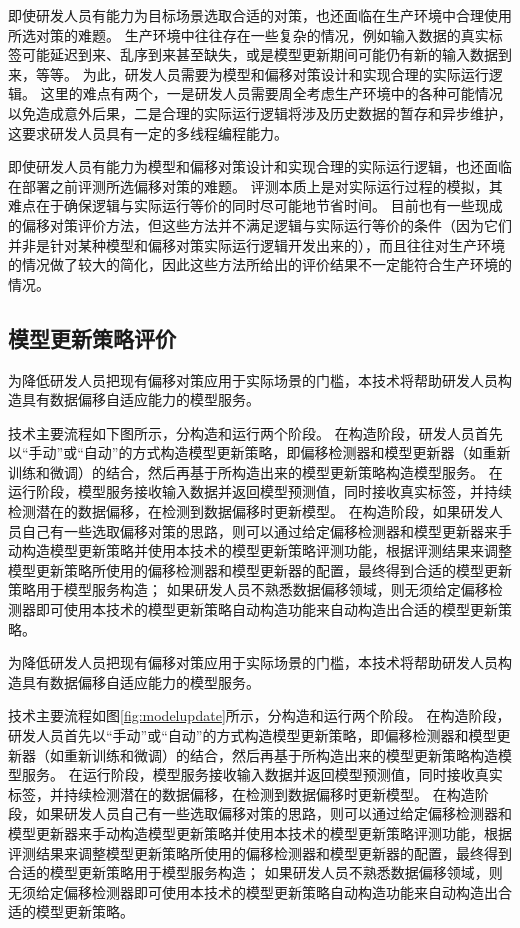 即使研发人员有能力为目标场景选取合适的对策，也还面临在生产环境中合理使用所选对策的难题。
生产环境中往往存在一些复杂的情况，例如输入数据的真实标签可能延迟到来、乱序到来甚至缺失，或是模型更新期间可能仍有新的输入数据到来，等等。
为此，研发人员需要为模型和偏移对策设计和实现合理的实际运行逻辑。
这里的难点有两个，一是研发人员需要周全考虑生产环境中的各种可能情况以免造成意外后果，二是合理的实际运行逻辑将涉及历史数据的暂存和异步维护，这要求研发人员具有一定的多线程编程能力。

即使研发人员有能力为模型和偏移对策设计和实现合理的实际运行逻辑，也还面临在部署之前评测所选偏移对策的难题。
评测本质上是对实际运行过程的模拟，其难点在于确保逻辑与实际运行等价的同时尽可能地节省时间。
目前也有一些现成的偏移对策评价方法，但这些方法并不满足逻辑与实际运行等价的条件（因为它们并非是针对某种模型和偏移对策实际运行逻辑开发出来的），而且往往对生产环境的情况做了较大的简化，因此这些方法所给出的评价结果不一定能符合生产环境的情况。

\subsection{模型更新策略评价}

为降低研发人员把现有偏移对策应用于实际场景的门槛，本技术将帮助研发人员构造具有数据偏移自适应能力的模型服务。

技术主要流程如下图所示，分构造和运行两个阶段。
在构造阶段，研发人员首先以“手动”或“自动”的方式构造模型更新策略，即偏移检测器和模型更新器（如重新训练和微调）的结合，然后再基于所构造出来的模型更新策略构造模型服务。
在运行阶段，模型服务接收输入数据并返回模型预测值，同时接收真实标签，并持续检测潜在的数据偏移，在检测到数据偏移时更新模型。
在构造阶段，如果研发人员自己有一些选取偏移对策的思路，则可以通过给定偏移检测器和模型更新器来手动构造模型更新策略并使用本技术的模型更新策略评测功能，根据评测结果来调整模型更新策略所使用的偏移检测器和模型更新器的配置，最终得到合适的模型更新策略用于模型服务构造；
如果研发人员不熟悉数据偏移领域，则无须给定偏移检测器即可使用本技术的模型更新策略自动构造功能来自动构造出合适的模型更新策略。

为降低研发人员把现有偏移对策应用于实际场景的门槛，本技术将帮助研发人员构造具有数据偏移自适应能力的模型服务。

技术主要流程如图\ref{fig:modelupdate}所示，分构造和运行两个阶段。
在构造阶段，研发人员首先以“手动”或“自动”的方式构造模型更新策略，即偏移检测器和模型更新器（如重新训练和微调）的结合，然后再基于所构造出来的模型更新策略构造模型服务。
在运行阶段，模型服务接收输入数据并返回模型预测值，同时接收真实标签，并持续检测潜在的数据偏移，在检测到数据偏移时更新模型。
在构造阶段，如果研发人员自己有一些选取偏移对策的思路，则可以通过给定偏移检测器和模型更新器来手动构造模型更新策略并使用本技术的模型更新策略评测功能，根据评测结果来调整模型更新策略所使用的偏移检测器和模型更新器的配置，最终得到合适的模型更新策略用于模型服务构造；
如果研发人员不熟悉数据偏移领域，则无须给定偏移检测器即可使用本技术的模型更新策略自动构造功能来自动构造出合适的模型更新策略。

